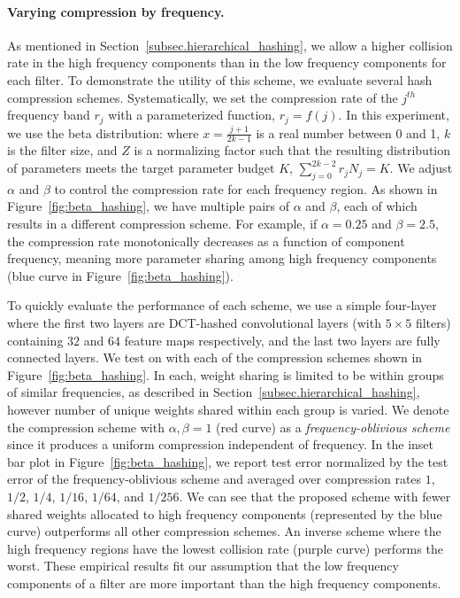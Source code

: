 \documentclass{article} %
\begin{document}
\paragraph{Varying compression by frequency.}
As mentioned in Section~\ref{subsec.hierarchical_hashing}, we allow a higher collision rate in the high frequency components than in the low frequency components for each filter.
To demonstrate the utility of this scheme, we evaluate several hash compression schemes.
Systematically, we set the compression rate of the $j^{th}$ frequency band $r_j$ with a parameterized function, \ie{}$r_j=f(j)$.
In this experiment, we use the beta distribution:
where $x\!=\!\frac{j+1}{2k-1}$ is a real number between 0 and 1, $k$ is the filter size, and $Z$ is a normalizing factor such that the resulting distribution of parameters meets the target parameter budget $K$, \ie{}$\sum_{j=0}^{2k-2} r_j N_j = K$.
We adjust $\alpha$ and $\beta$ to control the compression rate for each frequency region.
As shown in Figure~\ref{fig:beta_hashing}, we have multiple pairs of $\alpha$ and $\beta$, each of which results in a different compression scheme. For example, if $\alpha=0.25$ and $\beta=2.5$, the compression rate monotonically decreases as a function of component frequency, meaning more parameter sharing among high frequency components (blue curve in Figure~\ref{fig:beta_hashing}).

To quickly evaluate the performance of each scheme, we use a simple four-layer \abbrev{} where the first two layers are DCT-hashed convolutional layers (with $5\times 5$ filters) containing $32$ and $64$ feature maps respectively, and the last two layers are fully connected layers.
We test \abbrev{} on  with each of the compression schemes shown in Figure~\ref{fig:beta_hashing}.
In each, weight sharing is limited to be within groups of similar frequencies, as described in Section~\ref{subsec.hierarchical_hashing}, however number of unique weights shared within each group is varied.
We denote the compression scheme with $\alpha,\beta=1$ (red curve) as a \emph{frequency-oblivious scheme} since it produces a uniform compression independent of frequency.
In the inset bar plot in Figure~\ref{fig:beta_hashing}, we report test error normalized by the test error of the frequency-oblivious scheme and averaged over compression rates $1$, $1/2$, $1/4$, $1/16$, $1/64$, and $1/256$.
We can see that the proposed scheme with fewer shared weights allocated to high frequency components (represented by the blue curve) outperforms all other compression schemes.
An inverse scheme where the high frequency regions have the lowest collision rate (purple curve) performs the worst.
These empirical results fit our assumption that the low frequency components of a filter are more important than the high frequency components.
\end{document}
